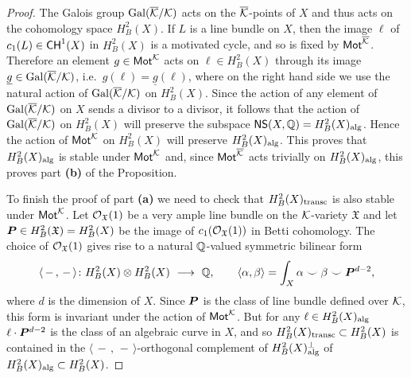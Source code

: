 \documentclass[twoside,leqno]{article}
\numberwithin{equation}{section}
\theoremstyle{plain}
\theoremstyle{definition}
\begin{document}
\begin{proof}  The Galois group $\operatorname{Gal}(\overline{\mathcal K}/\mathcal K)$ acts on the $\overline{\mathcal K}$-points of $X$ and thus acts on the 
cohomology space $H^{2}_{B}(X)$. 
If $L$ is a line bundle on $X$, then the image  $\ell$ of $c_{1}(L) \in \mathsf{CH}^{1}(X)$ in $H^{2}_{B}(X)$ is a motivated cycle, and so is fixed by $\mathsf{Mot}^{\overline{\mathcal K}}$. Therefore an element $g \in \mathsf{Mot}^{\mathcal K}$ acts on $\ell  \in H^{2}_{B}(X)$ through its image $\underline{g} \in \operatorname{Gal}(\overline{\mathcal K}/\mathcal K)$, i.e.\ $g(\ell) = \underline{g}(\ell)$, where on the right hand side we use the natural action of  $\operatorname{Gal}(\overline{\mathcal K}/\mathcal K)$ on $H^{2}_{B}(X)$. 
Since the action of any element of $\operatorname{Gal}(\overline{\mathcal K}/\mathcal K)$  on $X$ sends a divisor to a divisor, it follows that 
the action of $\operatorname{Gal}(\overline{\mathcal K}/\mathcal K)$  on $H^{2}_{B}(X)$ will preserve the subspace $\mathsf{NS}(X,\mathbb Q) = H^{2}_{B}(X)_{\operatorname{alg}}$. Hence the action of $\mathsf{Mot}^{\mathcal K}$ on $H^{2}_{B}(X)$ will preserve $H^{2}_{B}(X)_{\operatorname{alg}}$. This proves that $H^{2}_{B}(X)_{\operatorname{alg}}$ is stable under $\mathsf{Mot}^{\mathcal K}$ and, since $\mathsf{Mot}^{\overline{\mathcal K}}$ acts trivially on $H^{2}_{B}(X)_{\operatorname{alg}}$, this proves part  {\bfseries (b)} of the Proposition. 

To finish the proof of part {\bfseries (a)} we need to check that $H^{2}_{B}(X)_{\operatorname{transc}}$ is also stable under $\mathsf{Mot}^{\mathcal K}$.  Let $\mathcal O_{\mathfrak{X}}(1)$ be a very ample line bundle on the
$\mathcal K$-variety $\mathfrak{X}$ and let 
$\boldsymbol{P} \in
H^{2}_{B}(\mathfrak{X}) = H^{2}_{B}(X)$ be the image of $c_{1}(\mathcal O_{\mathfrak{X}}(1))$ in Betti
cohomology.
The choice of $\mathcal O_{\mathfrak{X}}(1)$  gives rise to a natural $\mathbb Q$-valued symmetric bilinear
form
\[
\langle \, - \, ,\,  - \, \rangle \colon H^{2}_{B}(X)\otimes H^{2}_{B}(X) \
\longrightarrow \ \mathbb Q, \qquad 
\langle \alpha,\beta \rangle = \int_{X} \alpha \smile \beta \smile \boldsymbol{P}^{d-2},
\]
where $d$ is the dimension of $X$. 
Since $\boldsymbol{P}$ is the class of line bundle defined over $\mathcal K$, this form is
invariant under the action of $\mathsf{Mot}^{\mathcal K}$. But for any $\ell \in H^{2}_{B}(X)_{\operatorname{alg}}$
$\ell\cdot \boldsymbol{P}^{d-2}$ is the class of an algebraic curve in $X$, and so $H^{2}_{B}(X)_{\operatorname{transc}} \subset H^{2}_{B}(X)$ is contained in the $\langle \, - \, ,\,  - \, \rangle$-orthogonal complement of $H^{2}_{B}(X)_{\operatorname{alg}}^{\perp}$ of  $H^{2}_{B}(X)_{\operatorname{alg}} \subset H^{2}_{B}(X)$.


\end{proof}
\end{document}
